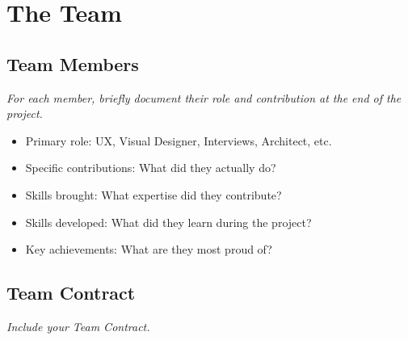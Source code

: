 \section{The Team}

\subsection{Team Members}
\emph{For each member, briefly document their role and contribution at the end of the project.}

\begin{itemize}
    \item Primary role: UX, Visual Designer, Interviews, Architect, etc.
    \item Specific contributions: What did they actually do?
    \item Skills brought: What expertise did they contribute?
    \item Skills developed: What did they learn during the project?
    \item Key achievements: What are they most proud of?
\end{itemize}

\subsection{Team Contract}
\emph{Include your Team Contract.}
